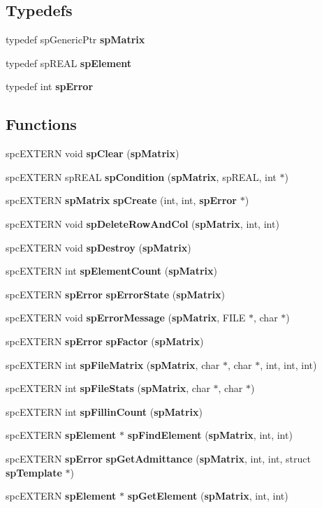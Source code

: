 \subsection*{Typedefs}
\begin{CompactItemize}
\item 
typedef sp\-Generic\-Ptr {\bf sp\-Matrix}
\item 
typedef sp\-REAL {\bf sp\-Element}
\item 
typedef int {\bf sp\-Error}
\end{CompactItemize}
\subsection*{Functions}
\begin{CompactItemize}
\item 
spc\-EXTERN void {\bf sp\-Clear} ({\bf sp\-Matrix})
\item 
spc\-EXTERN sp\-REAL {\bf sp\-Condition} ({\bf sp\-Matrix}, sp\-REAL, int $\ast$)
\item 
spc\-EXTERN {\bf sp\-Matrix} {\bf sp\-Create} (int, int, {\bf sp\-Error} $\ast$)
\item 
spc\-EXTERN void {\bf sp\-Delete\-Row\-And\-Col} ({\bf sp\-Matrix}, int, int)
\item 
spc\-EXTERN void {\bf sp\-Destroy} ({\bf sp\-Matrix})
\item 
spc\-EXTERN int {\bf sp\-Element\-Count} ({\bf sp\-Matrix})
\item 
spc\-EXTERN {\bf sp\-Error} {\bf sp\-Error\-State} ({\bf sp\-Matrix})
\item 
spc\-EXTERN void {\bf sp\-Error\-Message} ({\bf sp\-Matrix}, FILE $\ast$, char $\ast$)
\item 
spc\-EXTERN {\bf sp\-Error} {\bf sp\-Factor} ({\bf sp\-Matrix})
\item 
spc\-EXTERN int {\bf sp\-File\-Matrix} ({\bf sp\-Matrix}, char $\ast$, char $\ast$, int, int, int)
\item 
spc\-EXTERN int {\bf sp\-File\-Stats} ({\bf sp\-Matrix}, char $\ast$, char $\ast$)
\item 
spc\-EXTERN int {\bf sp\-Fillin\-Count} ({\bf sp\-Matrix})
\item 
spc\-EXTERN {\bf sp\-Element} $\ast$ {\bf sp\-Find\-Element} ({\bf sp\-Matrix}, int, int)
\item 
spc\-EXTERN {\bf sp\-Error} {\bf sp\-Get\-Admittance} ({\bf sp\-Matrix}, int, int, struct {\bf sp\-Template} $\ast$)
\item 
spc\-EXTERN {\bf sp\-Element} $\ast$ {\bf sp\-Get\-Element} ({\bf sp\-Matrix}, int, int)

\end{CompactItemize}
